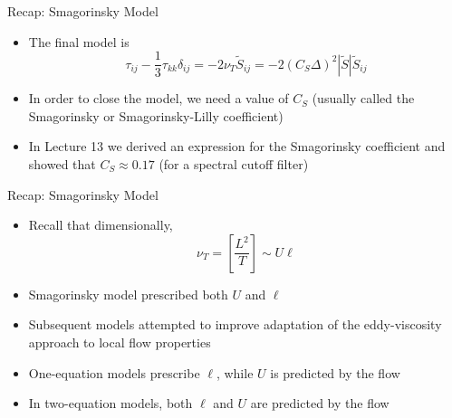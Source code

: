 \begin{frame}{Recap: Smagorinsky Model}

\begin{itemize}
	\item The final model is 
	$$\tau_{ij} - \frac{1}{3}\tau_{kk}\delta_{ij} = -2\nu_{T} \widetilde{S}_{ij} = -2 (C_S \Delta)^2 | \widetilde{S}| \widetilde{S}_{ij}$$
	\item In order to close the model, we need a value of $C_S$ (usually called the Smagorinsky or Smagorinsky-Lilly coefficient)
	\item In Lecture 13 we derived an expression for the Smagorinsky coefficient and showed that $C_S\approx0.17$ (for a spectral cutoff filter)
\end{itemize}

\end{frame}

\begin{frame}{Recap: Smagorinsky Model}
\begin{itemize}
	\item Recall that dimensionally,
	$$\nu_T = \left[ \frac{L^2}{T}\right] \sim U\ell$$
	\item Smagorinsky model prescribed both $U$ and $\ell$
	\item Subsequent models attempted to improve adaptation of the eddy-viscosity approach to local flow properties
	\item One-equation models prescribe $\ell$, while $U$ is predicted by the flow
	\item In two-equation models, both $\ell$ and $U$ are predicted by the flow
\end{itemize}

\end{frame}

